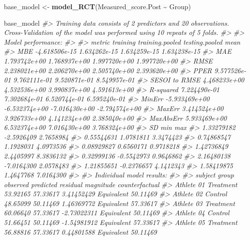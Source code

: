 \documentclass[
]{book}
\newenvironment{Shaded}{\begin{snugshade}}{\end{snugshade}}
\newcommand{\CommentTok}[1]{\textcolor[rgb]{0.56,0.35,0.01}{\textit{#1}}}
\newcommand{\KeywordTok}[1]{\textcolor[rgb]{0.13,0.29,0.53}{\textbf{#1}}}
\newcommand{\NormalTok}[1]{#1}
\newcommand{\OperatorTok}[1]{\textcolor[rgb]{0.81,0.36,0.00}{\textbf{#1}}}
\newcommand{\StringTok}[1]{\textcolor[rgb]{0.31,0.60,0.02}{#1}}
\begin{document}
\begin{Shaded}
\begin{Highlighting}[]
\NormalTok{base\_model <{-}}\StringTok{ }\KeywordTok{model\_RCT}\NormalTok{(Measured\_score.Post }\OperatorTok{\textasciitilde{}}\StringTok{ }\NormalTok{Group)}

\NormalTok{base\_model}
\CommentTok{\#> Training data consists of 2 predictors and 20 observations. Cross{-}Validation of the model was performed using 10 repeats of 5 folds.}
\CommentTok{\#> }
\CommentTok{\#> Model performance:}
\CommentTok{\#> }
\CommentTok{\#>         metric      training training.pooled testing.pooled          mean}
\CommentTok{\#>            MBE {-}4.618506e{-}15    1.634262e{-}15   1.634259e{-}15  1.634238e{-}15}
\CommentTok{\#>            MAE  1.793742e+00    1.768937e+00   1.997720e+00  1.997720e+00}
\CommentTok{\#>           RMSE  2.238021e+00    2.206270e+00   2.505740e+00  2.393620e+00}
\CommentTok{\#>           PPER  9.577526e{-}01    9.762111e{-}01   9.520871e{-}01  8.549957e{-}01}
\CommentTok{\#>  SESOI to RMSE  4.468233e+00    4.532536e+00   3.990837e+00  4.591613e+00}
\CommentTok{\#>      R{-}squared  7.224490e{-}01    7.302684e{-}01   6.520744e{-}01  6.595240e{-}01}
\CommentTok{\#>         MinErr {-}5.933469e+00   {-}6.532374e+00  {-}7.016430e+00 {-}2.794574e+00}
\CommentTok{\#>         MaxErr  3.414524e+00    3.926733e+00   4.141234e+00  2.385040e+00}
\CommentTok{\#>      MaxAbsErr  5.933469e+00    6.532374e+00   7.016430e+00  3.768324e+00}
\CommentTok{\#>          SD        min       max}
\CommentTok{\#>  1.33279182 {-}2.5926409 2.7658984}
\CommentTok{\#>  0.55544631  1.0781811 3.3474423}
\CommentTok{\#>  0.74868547  1.1928031 4.0973536}
\CommentTok{\#>  0.08929827  0.6560171 0.9718218}
\CommentTok{\#>  1.42736849  2.4405997 8.3836132}
\CommentTok{\#>  0.32999136 {-}0.5542973 0.9646862}
\CommentTok{\#>  2.16480138 {-}7.0164300 2.0578483}
\CommentTok{\#>  1.21855651 {-}0.2376657 4.1412343}
\CommentTok{\#>  1.58419875  1.4647768 7.0164300}
\CommentTok{\#> }
\CommentTok{\#> Individual model results:}
\CommentTok{\#> }
\CommentTok{\#>     subject     group observed predicted    residual  magnitude counterfactual}
\CommentTok{\#>  Athlete 01 Treatment 53.92165  57.33617  3.41452429 Equivalent       50.11469}
\CommentTok{\#>  Athlete 02   Control 48.65099  50.11469  1.46369772 Equivalent       57.33617}
\CommentTok{\#>  Athlete 03 Treatment 60.06640  57.33617 {-}2.73022311 Equivalent       50.11469}
\CommentTok{\#>  Athlete 04   Control 51.66451  50.11469 {-}1.54981912 Equivalent       57.33617}
\CommentTok{\#>  Athlete 05 Treatment 56.88816  57.33617  0.44801588 Equivalent       50.11469}

\end{Highlighting}
\end{Shaded}
\end{document}
